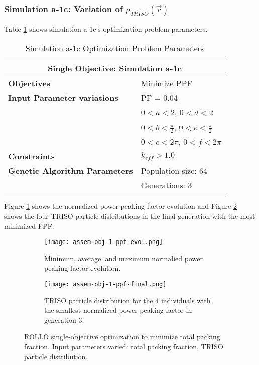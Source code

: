\subsubsection{Simulation a-1c: Variation of $\rho_{TRISO}(\vec{r})$}
Table \ref{tab:simulationa1c} shows simulation a-1c's optimization problem parameters. 
\begin{table}[htbp]
    \centering
    \onehalfspacing
    \caption{Simulation a-1c Optimization Problem Parameters}
	\label{tab:simulationa1c}
    \footnotesize
    \begin{tabular}{l|p{3cm}}
    \hline 
    \multicolumn{2}{c}{\textbf{Single Objective: Simulation a-1c}} \\
    \hline 
    \textbf{Objectives} & Minimize PPF \\
    \hline 
    \textbf{Input Parameter variations}
    & PF = 0.04 \\
    & $0<a<2$, $0<d<2$\\
    & $0<b<\frac{\pi}{2}$, $0<e<\frac{\pi}{2}$\\
    & $0<c<2\pi$, $0<f<2\pi$\\
    \hline
    \textbf{Constraints} & $k_{eff} > 1.0$\\ 
    \hline 
    \textbf{Genetic Algorithm Parameters} & Population size: 64 \\
    & Generations: 3 \\
    \hline
    \end{tabular}
\end{table}
Figure \ref{fig:assem-obj-1-ppf-evol} shows the normalized power peaking factor evolution 
and Figure \ref{fig:assem-obj-1-ppf-final} shows the four TRISO particle distributions in 
the final generation with the most minimized PPF. 
\begin{figure}[htbp]
    \centering
    \begin{subfigure}{\textwidth}
        \texttt{[image: assem-obj-1-ppf-evol.png]}
        \caption{Minimum, average, and maximum normalied power peaking factor evolution.}
        \label{fig:assem-obj-1-ppf-evol} 
    \end{subfigure}
    \begin{subfigure}{\textwidth}
        \texttt{[image: assem-obj-1-ppf-final.png]}
        \caption{TRISO particle distribution for the 4 individuals with the 
        smallest normalized power peaking factor in generation 3.}
        \label{fig:assem-obj-1-ppf-final} 
    \end{subfigure}
    \caption{ROLLO single-objective optimization to minimize total packing fraction. 
    Input parameters varied: total packing fraction, TRISO particle distribution.}
    \label{fig:assem-obj-1-ppf}
\end{figure}

